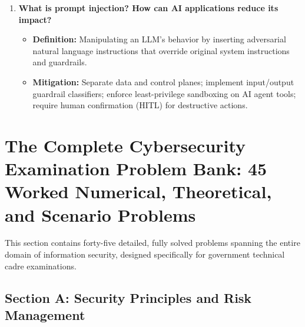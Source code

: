 \begin{enumerate}[label=\textbf{Q\arabic*.,resume},leftmargin=1.2cm]
\item \textbf{What is prompt injection? How can AI applications reduce its impact?}
\begin{itemize}
\item \textbf{Definition:} Manipulating an LLM's behavior by inserting adversarial natural language instructions that override original system instructions and guardrails.
\item \textbf{Mitigation:} Separate data and control planes; implement input/output guardrail classifiers; enforce least-privilege sandboxing on AI agent tools; require human confirmation (HITL) for destructive actions.
\end{itemize}
\end{enumerate}

\newpage

\section{The Complete Cybersecurity Examination Problem Bank: 45 Worked Numerical, Theoretical, and Scenario Problems}

This section contains forty-five detailed, fully solved problems spanning the entire domain of information security, designed specifically for government technical cadre examinations.

\subsection{Section A: Security Principles and Risk Management}

